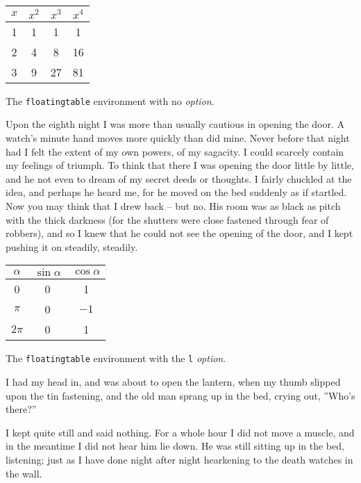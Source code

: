 \documentclass[11pt]{article}
\begin{document}
\begin{floatingtable}{
\begin{tabular}{cccc}
$x$ & $x^2$ & $x^3$ & $x^4$ \\ \hline
1 & 1 & 1 & 1 \\
2 & 4 & 8 & 16 \\
3 & 9 & 27 & 81 \\
\end{tabular}}
\caption{The \texttt{floatingtable} environment with no \textit{option}.}
\end{floatingtable}
Upon the eighth night I was more than usually
cautious in opening the door. A watch's minute
hand moves more quickly than did mine. Never
before that night had I felt the extent of my own
powers, of my sagacity. I could scarcely contain
my feelings of triumph. To think that there I was
opening the door little by little, and he not even to
dream of my secret deeds or thoughts. I fairly
chuckled at the idea, and perhaps he heard me, for
he moved on the bed suddenly as if startled. Now
you may think that I drew back -- but no. His room
was as black as pitch with the thick darkness (for
the shutters were close fastened through fear of
robbers), and so I knew that he could not see the
opening of the door, and I kept pushing it on
steadily, steadily.

\begin{floatingtable}[l]{
\begin{tabular}{ccc}
$\alpha$ & $\sin\alpha$ & $\cos\alpha$ \\ \hline
0 & 0 & 1 \\
$\pi$ & 0 & $-1$ \\
$2\pi$ & 0 & 1 \\
\end{tabular}}
\caption{The \texttt{floatingtable} environment with the \texttt{l}
\textit{option}.}
\end{floatingtable}
I had my head in, and was about to open the
lantern, when my thumb slipped upon the tin fasten\-ing,
and the old man sprang up in the bed, crying
out, ''Who's there?''

I kept quite still and said nothing. For a whole
hour I did not move a muscle, and in the meantime
I did not hear him lie down. He was still sitting
up in the bed, listening; just as I have done night
after night hearkening to the death watches in the
wall.
\end{document}
